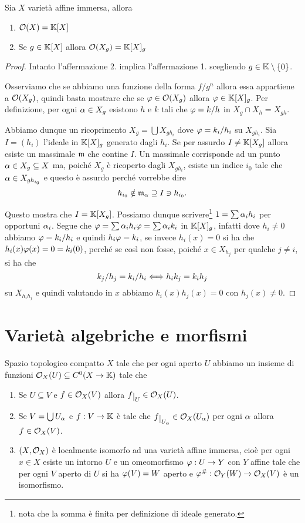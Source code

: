\begin{lemma}
Sia $X$ variet\`a affine immersa, allora
\begin{enumerate}
	\item $\mathcal{O}(X)=\mathbb{K}[X]$
	\item Se $g\in\mathbb{K}[X]$ allora $\mathcal{O}(X_g)=\mathbb{K}[X]_g$
\end{enumerate}
\end{lemma}
\begin{proof}
Intanto l'affermazione 2. implica l'affermazione 1. scegliendo $g\in\mathbb{K}\setminus\{0\}$. 

Osserviamo che se abbiamo una funzione della forma $f/g^n$ allora essa appartiene a $\mathcal{O}(X_g)$, quindi basta mostrare che se $\varphi\in \mathcal{O}(X_g)$ allora $\varphi\in\mathbb{K}[X]_g$. Per definizione, per ogni $\alpha\in X_g$ esistono $h$ e $k$ tali che $\varphi=k/h$ in $X_g\cap X_h=X_{gh}$.

Abbiamo dunque un ricoprimento $X_g=\bigcup X_{gh_i}$ dove $\varphi=k_i/h_i$ su $X_{gh_i}$. Sia $I=(h_i)$ l'ideale in $\mathbb{K}[X]_g$ generato dagli $h_i$. Se per assurdo $I\neq \mathbb{K}[X_g]$ allora esiste un massimale $\mathfrak{m}$ che contine $I$. Un massimale corrisponde ad un punto $\alpha\in X_g\subseteq X$ ma, poich\'e $X_g$ \`e ricoperto dagli $X_{gh_i}$, esiste un indice $i_0$ tale che $\alpha\in X_{gh_{i_0}}$ e questo \`e assurdo perch\'e vorrebbe dire 
\[h_{i_0}\notin \mathfrak{m}_\alpha\supseteq I\ni h_{i_0}.\]

Questo mostra che $I=\mathbb{K}[X_g]$. Possiamo dunque scrivere\footnote{nota che la somma \`e finita per definizione di ideale generato.} $1=\sum \alpha_i h_i$ per opportuni $\alpha_i$. Segue che $\varphi=\sum \alpha_i h_i\varphi=\sum \alpha_i k_i$ in $\mathbb{K}[X]_g$, infatti dove $h_i\neq 0$ abbiamo $\varphi=k_i/h_i$ e quindi $h_i\varphi=k_i$, se invece $h_i(x)=0$ si ha che $h_i(x)\varphi(x)=0=k_i(0)$, perch\'e se cos\`i non fosse, poich\'e $x\in X_{h_j}$ per qualche $j\neq i$, si ha che \[k_j/h_j=k_i/h_i\Longleftrightarrow h_ik_j=k_ih_j\] su $X_{h_ih_j}$ e quindi valutando in $x$ abbiamo $k_i(x)h_j(x)=0$ con $h_j(x)\neq 0$.
\end{proof}

\section{Variet\`a algebriche e morfismi}
\begin{definition}
Spazio topologico compatto $X$ tale che per ogni aperto $U$ abbiamo un insieme di funzioni $\mathcal{O}_X(U)\subseteq C^0(X\to \mathbb{K})$ tale che
\begin{enumerate}
	\item Se $U\subseteq V$ e $f\in \mathcal{O}_X(V)$ allora $f\res U\in \Oc_X(U)$.
	\item Se $V=\bigcup U_\alpha$ e $f:V\to \mathbb{K}$ \`e tale che $f\res{U_\al}\in \Oc_X(U_\al)$ per ogni $\alpha$ allora $f\in \mathcal{O}_X(V)$.
	\item $(X,\mathcal{O}_X)$ \`e localmente isomorfo ad una variet\`a affine immersa, cio\`e per ogni $x\in X$ esiste un intorno $U$ e un omeomorfismo $\varphi:U\to Y$ con $Y$ affine tale che per ogni $V$ aperto di $U$ si ha $\varphi(V)=W$ aperto e $\varphi^\#:\mathcal{O}_Y(W)\to\mathcal{O}_X(V)$ \`e un isomorfismo.
\end{enumerate}
\end{definition}


